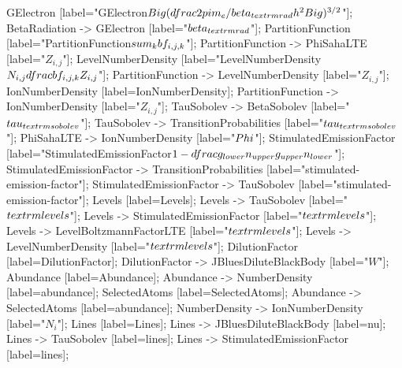 {	GElectron	 [label="GElectron\n$\\Big(\\dfrac{2\\pi m_{e}/                     \\beta_{\\textrm{rad}}}{h^2}\\Big)^{3/2}$"];
	BetaRadiation -> GElectron	 [label="$\\beta_{\\textrm{rad}}$"];
	PartitionFunction	 [label="PartitionFunction\n$\\sum_{k}bf_{i,j,k}$"];
	PartitionFunction -> PhiSahaLTE	 [label="$Z_{i,j}$"];
	LevelNumberDensity	 [label="LevelNumberDensity\n$N_{i,j}\\dfrac{bf_{i,j,k}}{Z_{i,j}}$"];
	PartitionFunction -> LevelNumberDensity	 [label="$Z_{i,j}$"];
	IonNumberDensity	 [label=IonNumberDensity];
	PartitionFunction -> IonNumberDensity	 [label="$Z_{i,j}$"];
	TauSobolev -> BetaSobolev	 [label="$\\tau_{\\textrm{sobolev}}$"];
	TauSobolev -> TransitionProbabilities	 [label="$\\tau_{\\textrm{sobolev}}$"];
	PhiSahaLTE -> IonNumberDensity	 [label="$\\Phi$"];
	StimulatedEmissionFactor	 [label="StimulatedEmissionFactor\n$1-\\dfrac{g_{lower}n_{upper}}{g_{upper}n_{lower}}$"];
	StimulatedEmissionFactor -> TransitionProbabilities	 [label="stimulated-emission-factor"];
	StimulatedEmissionFactor -> TauSobolev	 [label="stimulated-emission-factor"];
	Levels	 [label=Levels];
	Levels -> TauSobolev	 [label="$\\textrm{levels}$"];
	Levels -> StimulatedEmissionFactor	 [label="$\\textrm{levels}$"];
	Levels -> LevelBoltzmannFactorLTE	 [label="$\\textrm{levels}$"];
	Levels -> LevelNumberDensity	 [label="$\\textrm{levels}$"];
	DilutionFactor	 [label=DilutionFactor];
	DilutionFactor -> JBluesDiluteBlackBody	 [label="$W$"];
	Abundance	 [label=Abundance];
	Abundance -> NumberDensity	 [label=abundance];
	SelectedAtoms	 [label=SelectedAtoms];
	Abundance -> SelectedAtoms	 [label=abundance];
	NumberDensity -> IonNumberDensity	 [label="$N_{i}$"];
	Lines	 [label=Lines];
	Lines -> JBluesDiluteBlackBody	 [label=nu];
	Lines -> TauSobolev	 [label=lines];
	Lines -> StimulatedEmissionFactor	 [label=lines];
}
